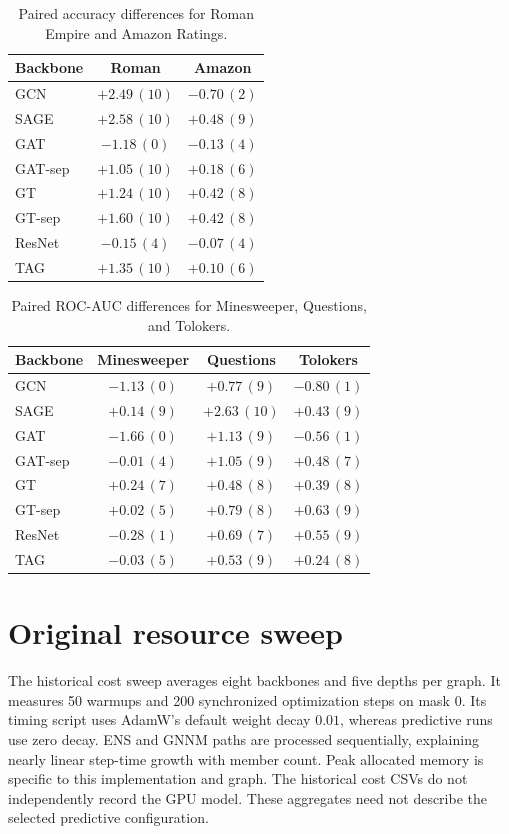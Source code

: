 \begin{table}[h]
\centering
\caption{Paired accuracy differences for Roman Empire and Amazon Ratings.}
\label{tab:paired}
\setlength{\tabcolsep}{5pt}
\begin{tabular}{lcc}
\toprule
Backbone & Roman & Amazon \\
\midrule
GCN & $+2.49\,(10)$ & $-0.70\,(2)$ \\
SAGE & $+2.58\,(10)$ & $+0.48\,(9)$ \\
GAT & $-1.18\,(0)$ & $-0.13\,(4)$ \\
GAT-sep & $+1.05\,(10)$ & $+0.18\,(6)$ \\
GT & $+1.24\,(10)$ & $+0.42\,(8)$ \\
GT-sep & $+1.60\,(10)$ & $+0.42\,(8)$ \\
ResNet & $-0.15\,(4)$ & $-0.07\,(4)$ \\
TAG & $+1.35\,(10)$ & $+0.10\,(6)$ \\
\bottomrule
\end{tabular}
\end{table}

\begin{table}[h]
\centering
\caption{Paired ROC-AUC differences for Minesweeper, Questions, and Tolokers.}
\label{tab:paired-auc}
\setlength{\tabcolsep}{5pt}
\begin{tabular}{lccc}
\toprule
Backbone & Minesweeper & Questions & Tolokers \\
\midrule
GCN & $-1.13\,(0)$ & $+0.77\,(9)$ & $-0.80\,(1)$ \\
SAGE & $+0.14\,(9)$ & $+2.63\,(10)$ & $+0.43\,(9)$ \\
GAT & $-1.66\,(0)$ & $+1.13\,(9)$ & $-0.56\,(1)$ \\
GAT-sep & $-0.01\,(4)$ & $+1.05\,(9)$ & $+0.48\,(7)$ \\
GT & $+0.24\,(7)$ & $+0.48\,(8)$ & $+0.39\,(8)$ \\
GT-sep & $+0.02\,(5)$ & $+0.79\,(8)$ & $+0.63\,(9)$ \\
ResNet & $-0.28\,(1)$ & $+0.69\,(7)$ & $+0.55\,(9)$ \\
TAG & $-0.03\,(5)$ & $+0.53\,(9)$ & $+0.24\,(8)$ \\
\bottomrule
\end{tabular}
\end{table}





\section{Original resource sweep}\label{app:cost-details}
The historical cost sweep averages eight backbones and five depths
per graph. It measures 50 warmups and 200 synchronized optimization
steps on mask 0. Its timing script uses AdamW's default weight decay
$0.01$, whereas predictive runs use zero decay. ENS and GNNM paths
are processed sequentially, explaining nearly linear step-time growth
with member count. Peak allocated memory is specific to this
implementation and graph. The historical cost CSVs do not
independently record the GPU model. These aggregates need not describe
the selected predictive configuration.



